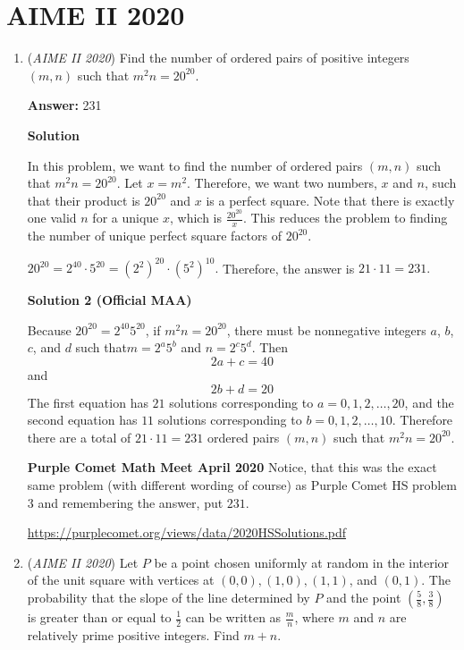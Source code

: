 \section{AIME II 2020}
        \begin{enumerate}
        	\item (\textit{AIME II 2020}) Find the number of ordered pairs of positive integers $(m,n)$ such that ${m^2n = 20 ^{20}}$.


 
 \textbf{Answer: }231



\textbf{Solution}

In this problem, we want to find the number of ordered pairs $(m, n)$ such that $m^2n = 20^{20}$. Let $x = m^2$. Therefore, we want two numbers, $x$ and $n$, such that their product is $20^{20}$ and $x$ is a perfect square. Note that there is exactly one valid $n$ for a unique $x$, which is $\frac{20^{20}}{x}$. This reduces the problem to finding the number of unique perfect square factors of $20^{20}$.

 
$20^{20} = 2^{40} \cdot 5^{20} = \left(2^2\right)^{20}\cdot\left(5^2\right)^{10}.$ Therefore, the answer is $21 \cdot 11 = \boxed{231}.$




\textbf{Solution 2 (Official MAA)}

Because $20^{20}=2^{40}5^{20}$, if $m^2n = 20^{20}$, there must be nonnegative integers $a$, $b$, $c$, and $d$ such that$m = 2^a5^b$ and $n = 2^c5^d$. Then
 \[2a + c = 40\]and
 \[2b+d = 20\]The first equation has $21$ solutions corresponding to $a = 0,1,2,\dots,20$, and the second equation has $11$ solutions corresponding to $b = 0,1,2,\dots,10$. Therefore there are a total of $21\cdot11 = \boxed{231}$ ordered pairs $(m,n)$ such that $m^2n = 20^{20}$.

 \textbf{Purple Comet Math Meet April 2020} Notice, that this was the exact same problem (with different wording of course) as Purple Comet HS problem 3 and remembering the answer, put $\boxed{231}$.

 \href{https://purplecomet.org/views/data/2020HSSolutions.pdf}{https://purplecomet.org/views/data/2020HSSolutions.pdf}

 


	\item (\textit{AIME II 2020}) Let $P$ be a point chosen uniformly at random in the interior of the unit square with vertices at $(0,0), (1,0), (1,1)$, and $(0,1)$. The probability that the slope of the line determined by $P$ and the point $\left(\frac58, \frac38 \right)$ is greater than or equal to $\frac12$ can be written as $\frac{m}{n}$, where $m$ and $n$ are relatively prime positive integers. Find $m+n$.



\end{enumerate}
